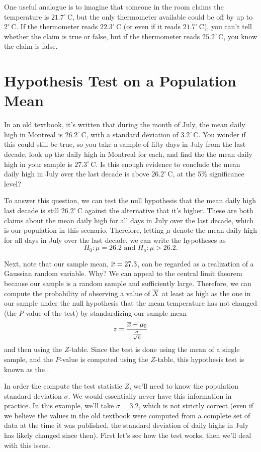 One useful analogue is to imagine that someone in the room claims the temperature is $21.7^\circ$\,C, but the only thermometer available could be off by up to $2^\circ$\,C. If the thermometer reads $22.3^\circ$\,C (or even if it reads $21.7^\circ$\,C), you can't tell whether the claim is true or false, but if the thermometer reads $25.2^\circ$\,C, you know the claim is false.

\section{Hypothesis Test on a Population Mean}

In an old textbook, it's written that during the month of July, the mean daily high in Montreal is $26.2^{\circ}$\,C, with a standard deviation of $3.2^{\circ}$\,C. You wonder if this could still be true, so you take a sample of fifty days in July from the last decade, look up the daily high in Montreal for each, and find the the mean daily high in your sample is $27.3^{\circ}$\,C. Is this enough evidence to conclude the mean daily high in July over the last decade is above $26.2^{\circ}$\,C, at the 5\% significance level?

To answer this question, we can test the null hypothesis that the mean daily high last decade is still $26.2^{\circ}$\,C against the alternative that it's higher. These are both claims about the mean daily high for all days in July over the last decade, which is our population in this scenario. Therefore, letting $\mu$ denote the mean daily high for all days in July over the last decade, we can write the hypotheses as
$$H_0: \mu = 26.2 \text{\ \ and \ \ }H_a: \mu > 26.2.$$

Next, note that our sample mean, ${\overline{x}} = 27.3$, can be regarded as a realization of a Gaussian random variable. Why? We can appeal to the central limit theorem because our sample is a random sample and sufficiently large. Therefore, we can compute the probability of observing a value of ${\overline{X}}$ at least as high as the one in our sample under the null hypothesis that the mean temperature has not changed (the $P$-value of the test) by standardizing our sample mean
$$z = \frac{{\overline{x}} - \mu_{0}}{\frac{\sigma}{\sqrt{n}}}$$
and then using the $Z$-table. Since the test is done using the mean of a single sample, and the $P$-value is computed using the $Z$-table, this hypothesis test is known as the .

\begin{remark}
In order the compute the test statistic $Z$, we'll need to know the population standard deviation $\sigma$. We would essentially never have this information in practice. In this example, we'll take $\sigma = 3.2$, which is not strictly correct (even if we believe the values in the old textbook were computed from a complete set of data at the time it was published, the standard deviation of daily highs in July has likely changed since then). First let's see how the test works, then we'll deal with this issue.
\end{remark}

